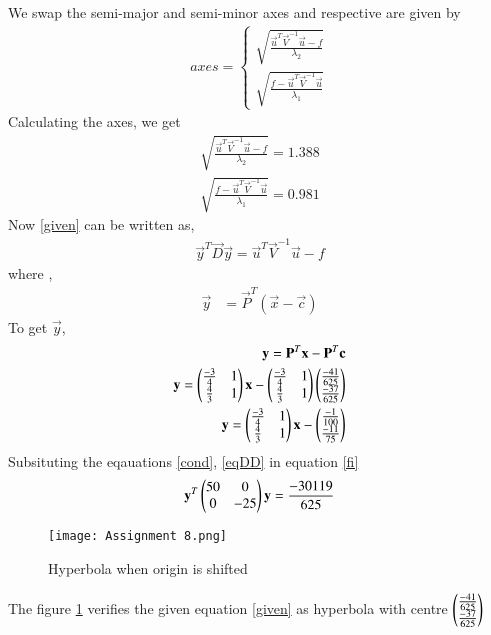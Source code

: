 \documentclass[journal,12pt,twocolumn]{IEEEtran}
\begin{document}
We swap the semi-major and semi-minor axes and respective are given by
\begin{align}
axes=
\begin{cases}
\sqrt{\frac{\vec{u}^T\vec{V}^{-1}\vec{u}-f}{\lambda_2}}\\ \sqrt{\frac{f-\vec{u}^T\vec{V}^{-1}\vec{u}}{\lambda_1}}
\end{cases}
\end{align}
Calculating the axes, we get
\begin{align}
\sqrt{\frac{\vec{u}^T\vec{V}^{-1}\vec{u}-f}{\lambda_2}}=1.388\\
\sqrt{\frac{f-\vec{u}^T\vec{V}^{-1}\vec{u}}{\lambda_1}}=0.981
\end{align}
Now \eqref{given} can be written as,
\begin{align}
    \vec{y}^T\vec{D}\vec{y}=\vec{u}^T\vec{V}^{-1}\vec{u}-f\label{fi}
\end{align}
where ,
\begin{align}
    \vec{y}&=\vec{P}^T(\vec{x}-\vec{c})
\end{align}
To get $\vec{y}$,
\begin{align}
    \mathbf{y}=\mathbf{P}^T\mathbf{x}-\mathbf{P}^T\mathbf{c}\\
    \mathbf{y}=\begin{pmatrix}\frac{-3}{4}&1\\\frac{4}{3}&1\end{pmatrix}\mathbf{x}-
    \begin{pmatrix}\frac{-3}{4}&1\\\frac{4}{3}&1\end{pmatrix}\begin{pmatrix}\frac{-41}{625}\\\frac{-37}{625}\end{pmatrix}\\
    \mathbf{y}=\begin{pmatrix}\frac{-3}{4}&1\\\frac{4}{3}&1\end{pmatrix}\mathbf{x}-
    \begin{pmatrix}\frac{-1}{100}\\\frac{-11}{75}\end{pmatrix}
\end{align}
Subsituting the eqauations \eqref{cond}, \eqref{eqDD} in equation \eqref{fi}
\begin{align}
    \mathbf{y}^T\begin{pmatrix}50&0\\0&-25\end{pmatrix}\mathbf{y}=\frac{-30119}{625}
\end{align}
\renewcommand{\thefigure}{1}
\begin{figure}[h]
    \centering
    \texttt{[image: Assignment 8.png]}
    \caption{Hyperbola when origin is shifted}
    \label{Fig :1}
\end{figure}
The figure \ref{Fig :1} verifies the given equation \eqref{given} as hyperbola with centre $\begin{pmatrix}\frac{-41}{625}\\\frac{-37}{625}\end{pmatrix}$
\end{document}
